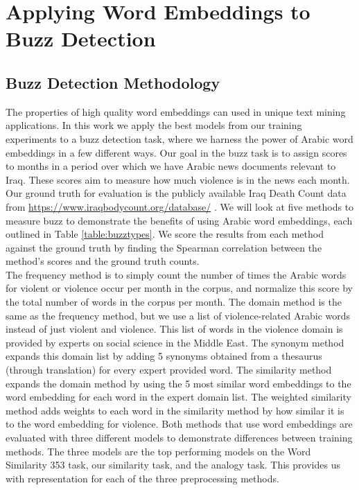\chapter{Applying Word Embeddings to Buzz Detection}
\label{sec:buzz}

\section{Buzz Detection Methodology}

The properties of high quality word embeddings can used in unique text mining applications. In this work we apply the best models from our training experiments to a buzz detection task, where we harness the power of Arabic word embeddings in a few different ways. Our goal in the buzz task is to assign scores to months in a period over which we have Arabic news documents relevant to Iraq. These scores aim to measure how much violence is in the news each month. Our ground truth for evaluation is the publicly available Iraq Death Count data from \url{https://www.iraqbodycount.org/database/} \cite{IraqB68:online}. We will look at five methods to measure buzz to demonstrate the benefits of using Arabic word embeddings, each outlined in Table \ref{table:buzztypes}. We score the results from each method against the ground truth by finding the Spearman correlation between the method's scores and the ground truth counts. 
\\
The frequency method is to simply count the number of times the Arabic words for violent or violence occur per month in the corpus, and normalize this score by the total number of words in the corpus per month. The domain method is the same as the frequency method, but we use a list of violence-related Arabic words instead of just violent and violence. This list of words in the violence domain is provided by experts on social science in the Middle East. The synonym method expands this domain list by adding 5 synonyms obtained from a thesaurus (through translation) for every expert provided word. The similarity method expands the domain method by using the 5 most similar word embeddings to the word embedding for each word in the expert domain list. The weighted similarity method adds weights to each word in the similarity method by how similar it is to the word embedding for violence. Both methods that use word embeddings are evaluated with three different models to demonstrate differences between training methods. The three models are the top performing models on the Word Similarity 353 task, our similarity task, and the analogy task. This provides us with representation for each of the three preprocessing methods.

